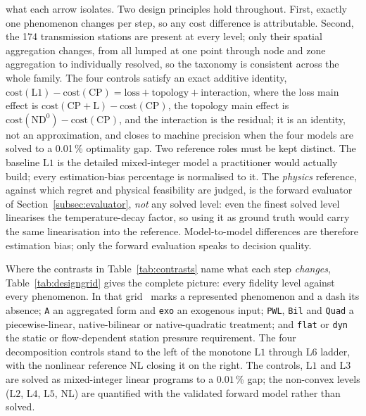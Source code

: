\documentclass[a4paper,fleqn]{cas-sc}
\newcommand{\CP}{\ensuremath{\mathrm{CP}}}      %
\newcommand{\CPL}{\ensuremath{\mathrm{CP{+}L}}} %
\newcommand{\NDz}{\ensuremath{\mathrm{ND^{0}}}} %
\newcommand{\Lone}{\ensuremath{\mathrm{L1}}}    %
\newcommand{\Ltwo}{\ensuremath{\mathrm{L2}}}    %
\newcommand{\Lthree}{\ensuremath{\mathrm{L3}}}  %
\newcommand{\Lfour}{\ensuremath{\mathrm{L4}}}   %
\newcommand{\Lfive}{\ensuremath{\mathrm{L5}}}   %
\newcommand{\Lsix}{\ensuremath{\mathrm{L6}}}    %
\begin{document}
what each arrow isolates. Two design principles hold throughout. First, exactly one phenomenon
changes per step, so any cost difference is attributable. Second, the 174 transmission stations
are present at every level; only their spatial aggregation changes, from all lumped at one
point through node and zone aggregation to individually resolved, so the taxonomy is consistent
across the whole family. The four controls satisfy an exact additive identity,
$\text{cost}(\Lone)-\text{cost}(\CP)=\text{loss}+\text{topology}+\text{interaction}$, where the
loss main effect is $\text{cost}(\CPL)-\text{cost}(\CP)$, the topology main effect is
$\text{cost}(\NDz)-\text{cost}(\CP)$, and the interaction is the residual; it is an identity,
not an approximation, and closes to machine precision when the four models are solved to a
0.01\,\% optimality gap.
Two reference roles must be kept distinct. The baseline $\Lone$ is the detailed
mixed-integer model a practitioner would actually build; every estimation-bias percentage is
normalised to it. The \emph{physics} reference, against which regret and physical feasibility
are judged, is the forward evaluator of Section~\ref{subsec:evaluator}, \emph{not} any solved
level: even the finest solved level linearises the temperature-decay factor, so using it as
ground truth would carry the same linearisation into the reference. Model-to-model differences
are therefore estimation bias; only the forward evaluation speaks to decision quality.

Where the contrasts in Table~\ref{tab:contrasts} name what each step \emph{changes},
Table~\ref{tab:designgrid} gives the complete picture: every fidelity level against every
phenomenon. In that grid \checkmark\ marks a represented phenomenon and a dash its absence;
\texttt{A} an aggregated form and \texttt{exo} an exogenous input; \texttt{PWL}, \texttt{Bil}
and \texttt{Quad} a piecewise-linear, native-bilinear or native-quadratic treatment; and
\texttt{flat} or \texttt{dyn} the static or flow-dependent station pressure requirement. The
four decomposition controls stand to the left of the monotone $\Lone$ through $\Lsix$ ladder,
with the nonlinear reference NL closing it on the right. The controls, $\Lone$ and $\Lthree$
are solved as mixed-integer linear programs to a $0.01$\,\% gap; the non-convex levels
($\Ltwo$, $\Lfour$, $\Lfive$, NL) are quantified with the validated forward model rather than
solved.

\end{document}
